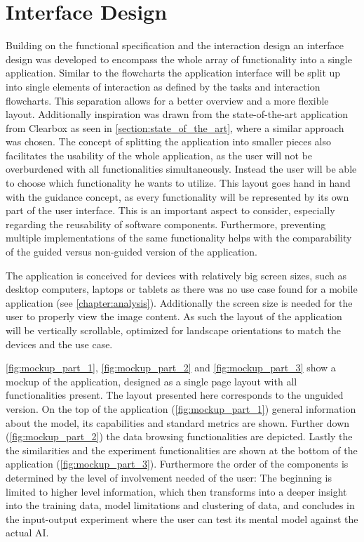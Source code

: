 \documentclass[11pt,a4paper,english]{scrreprt}
\begin{document}
\section{Interface Design}\label{section:interface_design}
Building on the functional specification and the interaction design an interface design was developed to encompass the whole array of functionality into a single application. Similar to the flowcharts the application interface will be split up into single elements of interaction as defined by the tasks and interaction flowcharts. This separation allows for a better overview and a more flexible layout. Additionally inspiration was drawn from the state-of-the-art application from Clearbox as seen in \autoref{section:state_of_the_art}, where a similar approach was chosen. The concept of splitting the application into smaller pieces also facilitates the usability of the whole application, as the user will not be overburdened with all functionalities simultaneously. Instead the user will be able to choose which functionality he wants to utilize. This layout goes hand in hand with the guidance concept, as every functionality will be represented by its own part of the user interface. This is an important aspect to consider, especially regarding the reusability of software components. Furthermore, preventing multiple implementations of the same functionality helps with the comparability of the guided versus non-guided version of the application.

The application is conceived for devices with relatively big screen sizes, such as desktop computers, laptops or tablets as there was no use case found for a mobile application (see \autoref{chapter:analysis}). Additionally the screen size is needed for the user to properly view the image content. As such the layout of the application will be vertically scrollable, optimized for landscape orientations to match the devices and the use case.

\autoref{fig:mockup_part_1}, \autoref{fig:mockup_part_2} and \autoref{fig:mockup_part_3} show a mockup of the application, designed as a single page layout with all functionalities present. The layout presented here corresponds to the unguided version. On the top of the application (\autoref{fig:mockup_part_1}) general information about the model, its capabilities and standard metrics are shown. Further down (\autoref{fig:mockup_part_2}) the data browsing functionalities are depicted. Lastly the the similarities and the experiment functionalities are shown at the bottom of the application (\autoref{fig:mockup_part_3}). Furthermore the order of the components is determined by the level of involvement needed of the user: The beginning is limited to higher level information, which then transforms into a deeper insight into the training data, model limitations and clustering of data, and concludes in the input-output experiment where the user can test its mental model against the actual AI.
\end{document}
